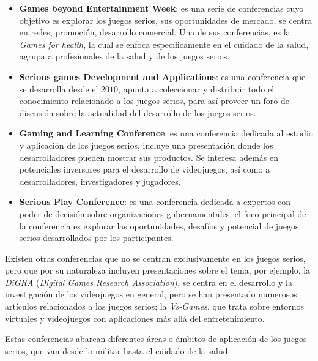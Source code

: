 \begin{itemize}
\item \textbf{Games beyond Entertainment Week}: es una serie de conferencias
    cuyo objetivo es explorar los juegos serios, sus oportunidades de mercado,
    se centra en redes, promoción, desarrollo comercial. Una de sus
    conferencias, es la \emph{Games for health}, la cual se enfoca
    específicamente en el cuidado de la salud, agrupa a profesionales de la
    salud y de los juegos serios\cite{games_beyond_entertainment}.
\item \textbf{Serious games Development and Applications}: es una conferencia
    que se desarrolla desde el $2010$, apunta a coleccionar y distribuir todo el
    conocimiento relacionado a los juegos serios, para así proveer un foro de
    discusión sobre la actualidad del desarrollo de los juegos
    serios\cite{sgda}.
\item \textbf{Gaming and Learning Conference}: es una conferencia dedicada al
    estudio y aplicación de los juegos serios, incluye una presentación donde
    los desarrolladores pueden mostrar sus productos. Se interesa además en
    potenciales inversores para el desarrollo de videojuegos, así como a
    desarrolladores, investigadores y jugadores\cite{gala}.
\item \textbf{Serious Play Conference}: es una conferencia dedicada a expertos
    con poder de decisión sobre organizaciones gubernamentales, el foco
    principal de la conferencia es explorar las oportunidades, desafíos y
    potencial de juegos serios desarrollados por los
    participantes\cite{seriousplay}.
\end{itemize}

Existen otras conferencias que no se centran exclusivamente en los juegos
serios, pero que por su naturaleza incluyen presentaciones sobre el tema, por
ejemplo, la \emph{DiGRA} (\textit{Digital Games Research Association}), se
centra en el desarrollo y la investigación de los videojuegos en general, pero
se han presentado numerosos artículos relacionados a  los juegos serios; la
\emph{Vs-Games}, que trata sobre entornos virtuales y videojuegos con  aplicaciones
más allá del entretenimiento.

Estas conferencias abarcan diferentes áreas o ámbitos de aplicación de los
juegos serios, que van desde lo militar hasta el cuidado de la salud.


